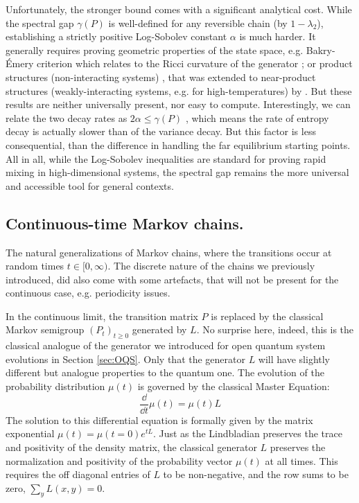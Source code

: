 Unfortunately, the stronger bound comes with a significant analytical cost. While the spectral gap $\gamma(P)$ is well-defined for any reversible chain (by $1-\lambda_2$), establishing a strictly positive Log-Sobolev constant $\alpha$ is much harder. It generally requires proving geometric properties of the state space, e.g. Bakry-Émery criterion which relates to the Ricci curvature of the generator \cite{bakry2006diffusions}; or product structures (non-interacting systems) \cite{diaconis1996logarithmic}, that was extended to near-product structures (weakly-interacting systems, e.g. for high-temperatures) by \cite{stroock1992logarithmic}. But these results are neither universally present, nor easy to compute. Interestingly, we can relate the two decay rates as $2\alpha \leq \gamma(P)$ \cite{diaconis1996logarithmic}, which means the rate of entropy decay is actually slower than of the variance decay. But this factor is less consequential, than the difference in handling the far equilibrium starting points. All in all, while the Log-Sobolev inequalities are standard for proving rapid mixing in high-dimensional systems, the spectral gap remains the more universal and accessible tool for general contexts.

\smallskip
\subsection{Continuous-time Markov chains.} The natural generalizations of Markov chains, where the transitions occur at random times $t\in[0, \infty)$. The discrete nature of the chains we previously introduced, did also come with some artefacts, that will not be present for the continuous case, e.g. periodicity issues. 

In the continuous limit, the transition matrix $P$ is replaced by the classical Markov semigroup $(P_t)_{t\geq 0}$ generated by $L$. No surprise here, indeed, this is the classical analogue of the generator we introduced for open quantum system evolutions in Section \ref{sec:OQS}. Only that the generator $L$ will have slightly different but analogue properties to the quantum one. The evolution of the probability distribution $\mu(t)$ is governed by the classical Master Equation:
\begin{equation}
    \frac{\dd}{\dd t} \mu(t) = \mu(t)L
\end{equation}
The solution to this differential equation is formally given by the matrix exponential $\mu(t) = \mu(t=0) e^{t L}$. Just as the Lindbladian preserves the trace and positivity of the density matrix, the classical generator $L$ preserves the normalization and positivity of the probability vector $\mu(t)$ at all times. This requires the off diagonal entries of $L$ to be non-negative, and the row sums to be zero, $\sum_y L(x, y) = 0$.

